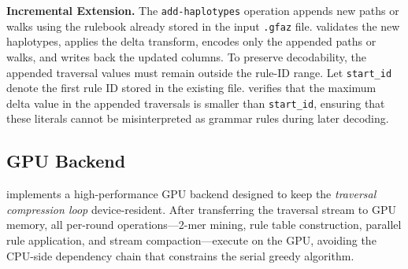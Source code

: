 \noindent \textbf{Incremental Extension.}
The \texttt{add-haplotypes} operation appends new paths or walks using the rulebook already stored in the input \texttt{.gfaz} file. \gfaz validates the new haplotypes, applies the delta transform, encodes only the appended paths or walks, and writes back the updated columns.
To preserve decodability, the appended traversal values must remain outside the rule-ID range. Let \texttt{start\_id} denote the first rule ID stored in the existing file. \gfaz verifies that the maximum delta value in the appended traversals is smaller than \texttt{start\_id}, ensuring that these literals cannot be misinterpreted as grammar rules during later decoding.

\subsection{GPU Backend}\label{subsec:gpu}

\gfaz implements a high-performance GPU backend designed to keep the \emph{traversal compression loop} device-resident. After transferring the traversal stream to GPU memory, all per-round operations---2-mer mining, rule table construction, parallel rule application, and stream compaction---execute on the GPU, avoiding the CPU-side dependency chain that constrains the serial greedy algorithm.

